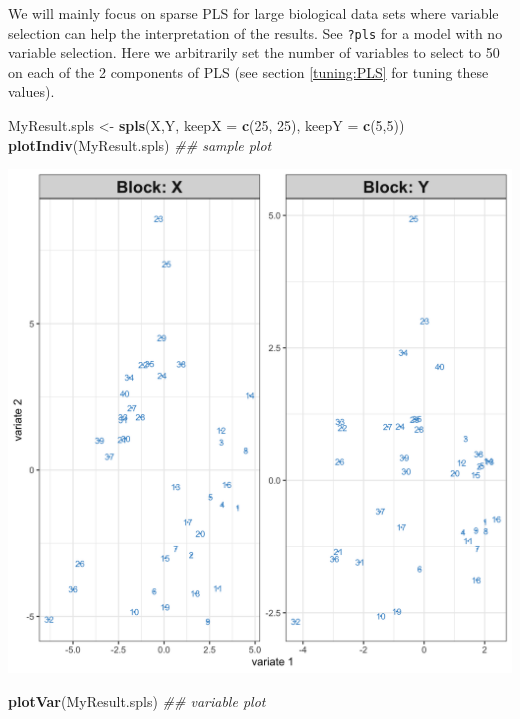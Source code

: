 \documentclass[]{book}
\newenvironment{Shaded}{\begin{snugshade}}{\end{snugshade}}
\newcommand{\CommentTok}[1]{\textcolor[rgb]{0.56,0.35,0.01}{\textit{#1}}}
\newcommand{\DataTypeTok}[1]{\textcolor[rgb]{0.13,0.29,0.53}{#1}}
\newcommand{\DecValTok}[1]{\textcolor[rgb]{0.00,0.00,0.81}{#1}}
\newcommand{\KeywordTok}[1]{\textcolor[rgb]{0.13,0.29,0.53}{\textbf{#1}}}
\newcommand{\NormalTok}[1]{#1}
\newcommand{\StringTok}[1]{\textcolor[rgb]{0.31,0.60,0.02}{#1}}
\begin{document}
We will mainly focus on sparse PLS for large biological data sets where variable selection can help the interpretation of the results. See \texttt{?pls} for a model with no variable selection. Here we arbitrarily set the number of variables to select to 50 on each of the 2 components of PLS (see section \ref{tuning:PLS} for tuning these values).

\begin{Shaded}
\begin{Highlighting}[]
\NormalTok{MyResult.spls <-}\StringTok{ }\KeywordTok{spls}\NormalTok{(X,Y, }\DataTypeTok{keepX =} \KeywordTok{c}\NormalTok{(}\DecValTok{25}\NormalTok{, }\DecValTok{25}\NormalTok{), }\DataTypeTok{keepY =} \KeywordTok{c}\NormalTok{(}\DecValTok{5}\NormalTok{,}\DecValTok{5}\NormalTok{))  }
\KeywordTok{plotIndiv}\NormalTok{(MyResult.spls)     }\CommentTok{## sample plot                   }
\end{Highlighting}
\end{Shaded}

\begin{center}\includegraphics[width=0.75\linewidth,]{Figures/05-pls-and-plots-1} \end{center}

\begin{Shaded}
\begin{Highlighting}[]
\KeywordTok{plotVar}\NormalTok{(MyResult.spls)       }\CommentTok{## variable plot}
\end{Highlighting}
\end{Shaded}
\end{document}
